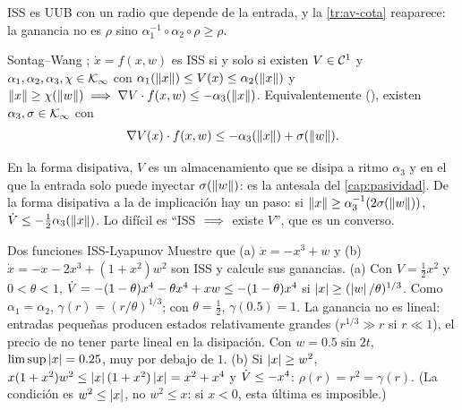 ISS es UUB con un radio que depende de la entrada, y la \cref{tr:av-cota} reaparece: la ganancia no es $\rho$ sino $\alpha_1^{-1}\circ\alpha_2\circ\rho\ge\rho$.

\begin{teorema}[label=thm:av-sontagwang]{Sontag--Wang \citep{SoWa95}; \citep[Teo.~7.4]{KeBr23}}
$\dot x=f(x,w)$ es ISS si y solo si existen $V\in\mathcal{C}^{1}$ y $\alpha_1,\alpha_2,\alpha_3,\chi\in\mathcal{K}_{\infty}$ con $\alpha_1(\left\lVert x\right\rVert)\le V(x)\le\alpha_2(\left\lVert x\right\rVert)$ y $\left\lVert x\right\rVert\ge\chi(\left\lVert w\right\rVert)\;\Longrightarrow\;\nabla V\cdot f(x,w)\le-\alpha_3(\left\lVert x\right\rVert)$. Equivalentemente (), existen $\alpha_3,\sigma\in\mathcal{K}_{\infty}$ con
\begin{equation}
  \nabla V(x)\cdot f(x,w)\le-\alpha_3(\left\lVert x\right\rVert)+\sigma(\left\lVert w\right\rVert) .
  \label{eq:av-issdisip}
\end{equation}
\end{teorema}

En la forma disipativa, $V$ es un almacenamiento que se disipa a ritmo $\alpha_3$ y en el que la entrada solo puede inyectar $\sigma(\left\lVert w\right\rVert)$: es la antesala del \cref{cap:pasividad}. De la forma disipativa a la de implicación hay un paso: si $\left\lVert x\right\rVert\ge\alpha_3^{-1}(2\sigma(\left\lVert w\right\rVert))$, $\dot V\le-\tfrac12\alpha_3(\left\lVert x\right\rVert)$. Lo difícil es ``ISS $\;\Longrightarrow\;$ existe $V$'', que es un converso.

\begin{ejemplo}[label=ej:av-issej]{Dos funciones ISS-Lyapunov}
Muestre que (a) $\dot x=-x^3+w$ y (b) $\dot x=-x-2x^3+(1+x^2)w^2$ son ISS y calcule sus ganancias.
\solucion (a) Con $V=\tfrac12x^2$ y $0<\theta<1$, $\dot V=-(1-\theta)x^4-\theta x^4+xw\le-(1-\theta)x^4$ si $\left\lvert x\right\rvert\ge(\left\lvert w\right\rvert/\theta)^{1/3}$. Como $\alpha_1=\alpha_2$, $\gamma(r)=(r/\theta)^{1/3}$; con $\theta=\tfrac12$, $\gamma(0.5)=1$. La ganancia no es lineal: entradas pequeñas producen estados relativamente grandes ($r^{1/3}\gg r$ si $r\ll1$), el precio de no tener parte lineal en la disipación. Con $w=0.5\sin2t$, $\limsup\left\lvert x\right\rvert=0.25$, muy por debajo de $1$.
(b) Si $\left\lvert x\right\rvert\ge w^2$, $x(1+x^2)w^2\le\left\lvert x\right\rvert(1+x^2)\left\lvert x\right\rvert=x^2+x^4$ y $\dot V\le-x^4$: $\rho(r)=r^2=\gamma(r)$. (La condición es $w^2\le\left\lvert x\right\rvert$, no $w^2\le x$: si $x<0$, esta última es imposible.)
\end{ejemplo}


